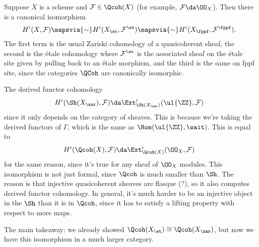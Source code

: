 \begin{theorem}\label{thm:et_qcs_zar}

Suppose \(X\) is a scheme and \(\mathcal{F}\in \Qcoh(X)\) (for example,
\(\mathcal{F} \da \OO_X\)). Then there is a canonical isomorphism
\begin{align*}  
H^i(X, \mathcal{F}) \mapsvia{\sim} H^i(X_\et, \mathcal{F}^{\et}) \mapsvia{\sim} H^i(X_{\fppf}, \mathcal{F}^{\fppf})
,\end{align*} The first term is the usual Zariski cohomology of a
quasicoherent sheaf, the second is the étale cohomology where
\(\mathcal{F}^{\et}\) is the associated sheaf on the étale site given by
pulling back to an étale morphism, and the third is the same on fppf
site, since the categories \(\QCoh\) are canonically isomorphic.

\end{theorem}

\begin{remark}

The derived functor cohomology
\begin{align*}
H^i(\Sh(X_{\zar}), \mathcal{F}) \da \Ext^i_{\Sh(X_\zar)}(\ul{\ZZ}, \mathcal{F})
\end{align*} since it only depends on the category of sheaves. This is
because we're taking the derived functors of \(\Gamma\), which is the
same as \(\Hom(\ul{\ZZ}, \wait)\). This is equal to
\begin{align*}
H^i(\Qcoh(X), \mathcal{F}) \da \Ext^i_{\Qcoh(X)}(\OO_X, \mathcal{F})
\end{align*} for the same reason, since it's true for any sheaf of
\(\OO_X\) modules. This isomorphism is not just formal, since \(\Qcoh\)
is much smaller than \(\Sh\). The reason is that injective quasicoherent
sheaves are flasque (?), so it also computes derived functor cohomology.
In general, it's much harder to be an injective object in the \(\Sh\)
than it is in \(\Qcoh\), since it has to satisfy a lifting property with
respect to more maps.

The main takeaway: we already showed
\(\Qcoh(X_\et) \cong \Qcoh(X_\zar)\), but now we have this isomorphism
in a much larger category.

\end{remark}

